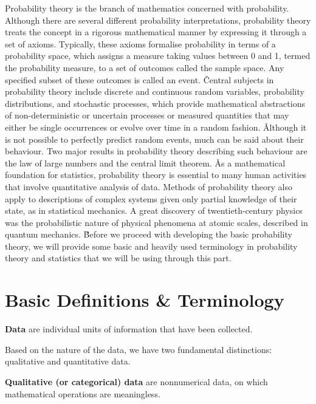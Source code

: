 Probability theory is the branch of mathematics concerned with probability. Although there are several different
probability interpretations, probability theory treats the concept in a rigorous mathematical manner by expressing it
through a set of axioms. Typically, these axioms formalise probability in terms of a probability space, which assigns
a measure taking values between 0 and 1, termed the probability measure, to a set of outcomes called the sample space.
Any specified subset of these outcomes is called an event. \v

Central subjects in probability theory include discrete and continuous random variables, probability distributions,
and stochastic processes, which provide mathematical abstractions of non-deterministic or uncertain processes or
measured quantities that may either be single occurrences or evolve over time in a random fashion. \v

Although it is not possible to perfectly predict random events, much can be said about their behaviour. Two major
results in probability theory describing such behaviour are the law of large numbers and the central limit theorem. \v

As a mathematical foundation for statistics, probability theory is essential to many human activities that involve
quantitative analysis of data. Methods of probability theory also apply to descriptions of complex systems given only
partial knowledge of their state, as in statistical mechanics. A great discovery of twentieth-century physics was the
probabilistic nature of physical phenomena at atomic scales, described in quantum mechanics. \v

Before we proceed with developing the basic probability theory, we will provide some basic and heavily used
terminology in probability theory and statistics that we will be using through this part.

\section{Basic Definitions \& Terminology}

\bd[Data]
\textbf{Data} are individual units of information that have been collected.
\ed

Based on the nature of the data, we have two fundamental distinctions: qualitative and quantitative data.

\textbf{Qualitative (or categorical) data} are nonnumerical data, on which mathematical operations are meaningless.
\ed

